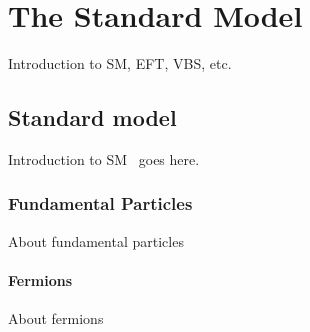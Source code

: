 \chapter{
  The Standard Model
 }\label{ch_smp}

Introduction to \gls{SM}, \gls{EFT}, \gls{VBS}, etc.

\section{Standard model}

Introduction to \gls{SM}~\cite{Yang-Mill:1954} goes here.

\subsection{Fundamental Particles}

About fundamental particles

\subsubsection{Fermions}

About fermions